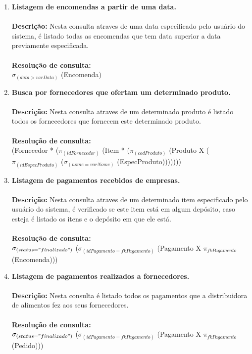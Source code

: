 \documentclass[12pt, onecolumn, titlepage]{article}
\begin{document}
\begin{enumerate}

\item \textbf{Listagem de encomendas a partir de uma data.} \\\\
\qquad \textbf{Descrição:} Nesta consulta atraves de uma data especificado pelo usuário do sistema, é listado todas as encomendas que tem data superior a data previamente especificada.\\\\
\qquad \textbf{Resolução de consulta:}\\
\qquad $\sigma _{(data > varData )}$ (Encomenda)\\

\item \textbf{Busca por fornecedores que ofertam um determinado produto.}\\\\
\qquad \textbf{Descrição:} Nesta consulta atraves de um determinado produto é listado todos os fornecedores que fornecem este determinado produto.\\\\
\qquad \textbf{Resolução de consulta:}\\
\qquad (Fornecedor * ($\pi _{(idFornecedor)}$ (Item * ($\pi _{(codProduto)}$ (Produto X ($\pi _{(idEspecProduto)}$ ($\sigma _{(nome=varNome)}$ (EspecProduto)))))))\\

\item \textbf{Listagem de pagamentos recebidos de empresas.} \\\\
\qquad \textbf{Descrição:} Nesta consulta atraves de um determinado item especificado pelo usuário do sistema, é verificado se este item está em algum depósito, caso esteja é listado os itens e o depósito em que ele está.\\\\
\qquad \textbf{Resolução de consulta:}\\
\qquad $\sigma _{(status="finalizado")}$ ($\sigma _{(idPagamento=fkPagamento)}$ (Pagamento X $\pi_{fkPagamento}$ (Encomenda)))

\item \textbf{Listagem de pagamentos realizados a fornecedores.} \\\\
\qquad \textbf{Descrição:} Nesta consulta é listado todos os pagamentos que a distribuidora de alimentos fez aos seus fornecedores.\\\\
\qquad \textbf{Resolução de consulta:}\\
\qquad $\sigma _{(status="finalizado")}$ ($\sigma _{(idPagamento=fkPagamento)}$ (Pagamento X $\pi_{fkPagamento}$ (Pedido)))\\


\end{enumerate}
\end{document}
